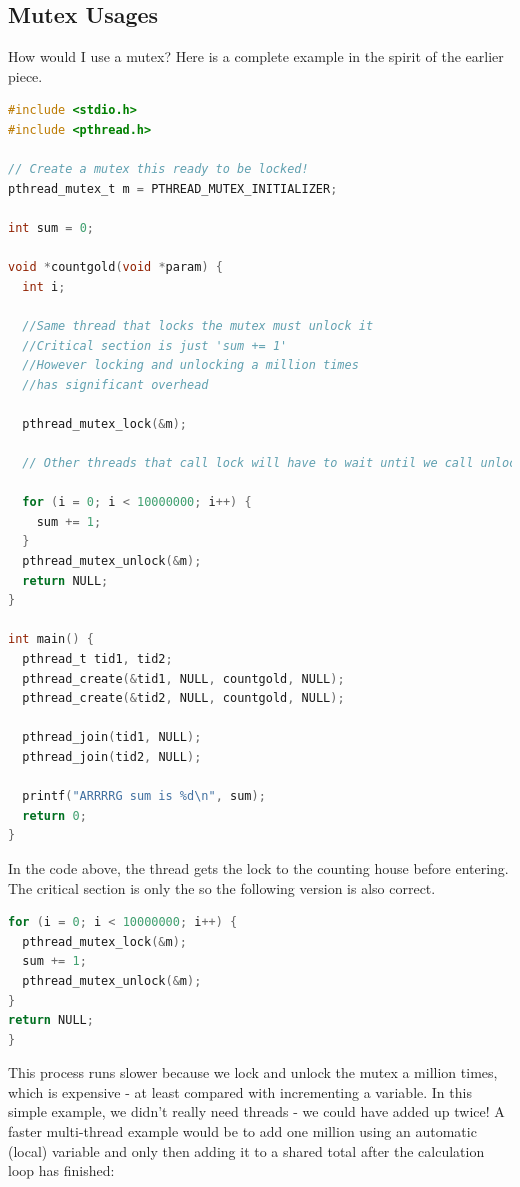 \subsection{Mutex Usages}

How would I use a mutex?
Here is a complete example in the spirit of the earlier piece.

\begin{lstlisting}[language=C]
#include <stdio.h>
#include <pthread.h>

// Create a mutex this ready to be locked!
pthread_mutex_t m = PTHREAD_MUTEX_INITIALIZER;

int sum = 0;

void *countgold(void *param) {
  int i;

  //Same thread that locks the mutex must unlock it
  //Critical section is just 'sum += 1'
  //However locking and unlocking a million times
  //has significant overhead

  pthread_mutex_lock(&m);

  // Other threads that call lock will have to wait until we call unlock

  for (i = 0; i < 10000000; i++) {
    sum += 1;
  }
  pthread_mutex_unlock(&m);
  return NULL;
}

int main() {
  pthread_t tid1, tid2;
  pthread_create(&tid1, NULL, countgold, NULL);
  pthread_create(&tid2, NULL, countgold, NULL);

  pthread_join(tid1, NULL);
  pthread_join(tid2, NULL);

  printf("ARRRRG sum is %d\n", sum);
  return 0;
}
\end{lstlisting}

In the code above, the thread gets the lock to the counting house before entering.
The critical section is only the  so the following version is also correct.

\begin{lstlisting}[language=C]
for (i = 0; i < 10000000; i++) {
  pthread_mutex_lock(&m);
  sum += 1;
  pthread_mutex_unlock(&m);
}
return NULL;
}
\end{lstlisting}

This process runs slower because we lock and unlock the mutex a million times, which is expensive - at least compared with incrementing a variable.
In this simple example, we didn't really need threads - we could have added up twice!
A faster multi-thread example would be to add one million using an automatic (local) variable and only then adding it to a shared total after the calculation loop has finished:

